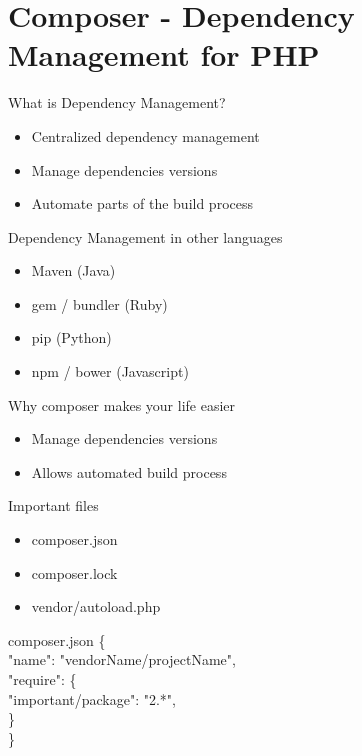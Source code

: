 \section{Composer - Dependency Management for PHP}

\begin{frame}{What is Dependency Management?}
	\begin{itemize}
		\item Centralized dependency management
		\item Manage dependencies versions
		\item Automate parts of the build process
	\end{itemize}
\end{frame}

\begin{frame}{Dependency Management in other languages}
	\begin{itemize}
		\item Maven (Java)
		\item gem / bundler (Ruby)
		\item pip (Python)
		\item npm / bower (Javascript)
	\end{itemize}
\end{frame}

\begin{frame}{Why composer makes your life easier}
	\begin{itemize}
		\item Manage dependencies versions
		\item Allows automated build process
	\end{itemize}
\end{frame}


\begin{frame}{Important files}
	\begin{itemize}
		\item composer.json
		\item composer.lock
		\item vendor/autoload.php
	\end{itemize}
\end{frame}

\begin{frame}{composer.json}
	\{ ~\\
		\hspace{1cm}"name": "vendorName/projectName", ~\\
		\hspace{1cm}"require": \{ ~\\
		\hspace{2cm}"important/package": "2.*", ~\\
		\hspace{1cm}\} ~\\
	\} ~\\
\end{frame}

